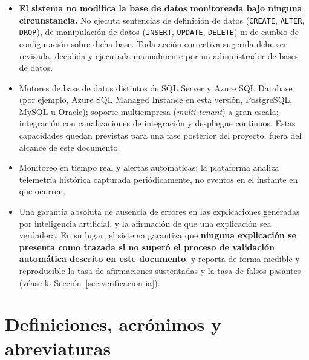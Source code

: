 \documentclass[11pt,a4paper]{report}
\begin{document}
\begin{itemize}
\item \textbf{El sistema no modifica la base de datos monitoreada bajo ninguna circunstancia.} No ejecuta sentencias de definici\'on de datos (\texttt{CREATE}, \texttt{ALTER}, \texttt{DROP}), de manipulaci\'on de datos (\texttt{INSERT}, \texttt{UPDATE}, \texttt{DELETE}) ni de cambio de configuraci\'on sobre dicha base. Toda acci\'on correctiva sugerida debe ser revisada, decidida y ejecutada manualmente por un administrador de bases de datos.
\item Motores de base de datos distintos de SQL Server y Azure SQL Database (por ejemplo, Azure SQL Managed Instance en esta versi\'on, PostgreSQL, MySQL u Oracle); soporte multiempresa (\textit{multi-tenant}) a gran escala; integraci\'on con canalizaciones de integraci\'on y despliegue continuos. Estas capacidades quedan previstas para una fase posterior del proyecto, fuera del alcance de este documento.
\item Monitoreo en tiempo real y alertas autom\'aticas; la plataforma analiza telemetr\'ia hist\'orica capturada peri\'odicamente, no eventos en el instante en que ocurren.
\item Una garant\'ia absoluta de ausencia de errores en las explicaciones generadas por inteligencia artificial, y la afirmaci\'on de que una explicaci\'on sea verdadera. En su lugar, el sistema garantiza que \textbf{ninguna explicaci\'on se presenta como trazada si no super\'o el proceso de validaci\'on autom\'atica descrito en este documento}, y reporta de forma medible y reproducible la tasa de afirmaciones sustentadas y la tasa de falsos pasantes (v\'ease la Secci\'on~\ref{sec:verificacion-ia}).
\end{itemize}

\section{Definiciones, acr\'onimos y abreviaturas}
\label{sec:definiciones}
\end{document}
